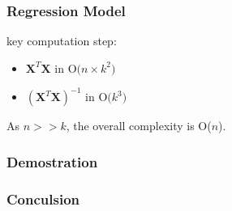 \documentclass[11pt]{beamer}
\begin{document}
\begin{frame}
\frametitle{Regression Model}
\begin{tcolorbox}[colback=blue!5,colframe=blue!40!black,title=Complexity]
key computation step:
\begin{itemize}
\item \(\textbf{X}^T\textbf{X} \mbox{ in O(} n\times k^2 \mbox{)}\)
\item \((\textbf{X}^T\textbf{X})^{-1} \mbox{ in O(} k^3 \mbox{)}\)
\end{itemize}
As \(n>>k\), the overall complexity is O(\(n\)).
\end{tcolorbox}
\end{frame}

\begin{frame}
\frametitle{Demostration}

\end{frame}

\begin{frame}
\frametitle{Conculsion}

\end{frame}
\end{document}
